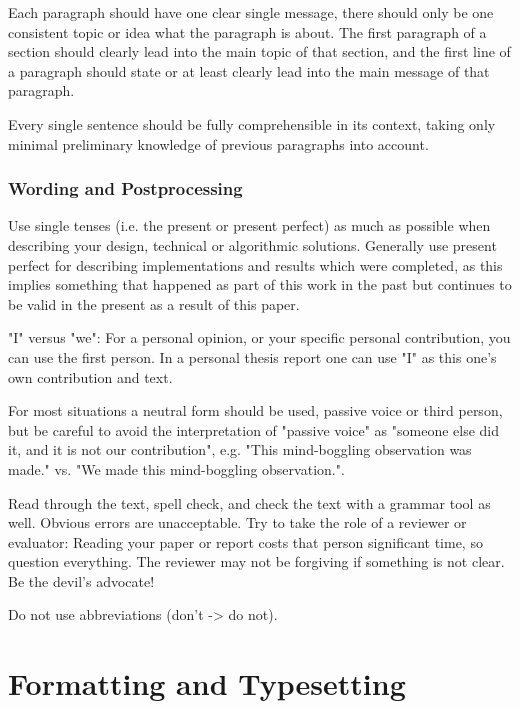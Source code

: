 \documentclass[11pt, a4paper,oneside,chapterprefix=false]{scrbook}
\begin{document}
Each paragraph should have one clear single message, there should only be one consistent topic or idea what the paragraph is about. The first paragraph of a section should clearly lead into the main topic of that section, and the first line of a paragraph should state or at least clearly lead into the main message of that paragraph.

Every single sentence should be fully comprehensible in its context, taking only minimal preliminary knowledge of previous paragraphs into account.

\subsubsection*{Wording and Postprocessing}

Use single tenses (i.e. the present or present perfect) as much as possible when describing your design, technical or algorithmic solutions. Generally use present perfect for describing implementations and results which were completed, as this implies something that happened as part of this work in the past but continues to be valid in the present as a result of this paper.

"I" versus "we": For a personal opinion, or your specific personal contribution, you can use the first person. In a personal thesis report one can use "I" as this one's own contribution and text.

For most situations a neutral form should be used, passive voice or third person, but be careful to avoid the interpretation of "passive voice" as "someone else did it, and it is not our contribution", e.g. "This mind-boggling observation was made." vs. "We made this mind-boggling observation.".

Read through the text, spell check, and check the text with a grammar tool as well. Obvious errors are unacceptable.
Try to take the role of a reviewer or evaluator: Reading your paper or report costs that person significant time, so question everything. The reviewer may not be forgiving if something is not clear. Be the devil's advocate!

Do not use abbreviations (don't -> do not).

\section*{Formatting and Typesetting} \label{sec:formatting}
\end{document}
